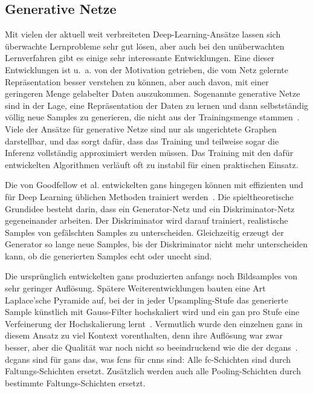\subsection{Generative Netze}

Mit vielen der aktuell weit verbreiteten Deep-Learning-Ansätze lassen sich überwachte Lernprobleme sehr gut lösen, aber auch bei den unüberwachten Lernverfahren gibt es einige sehr interessante Entwicklungen.
Eine dieser Entwicklungen ist u.~a. von der Motivation getrieben, die vom Netz gelernte Repräsentation besser verstehen zu können, aber auch davon, mit einer geringeren Menge gelabelter Daten auszukommen.
Sogenannte generative Netze sind in der Lage, eine Repräsentation der Daten zu lernen und dann selbstständig völlig neue Samples zu generieren, die nicht aus der Trainingsmenge stammen~\cite{Goodfellow.2016}.
Viele der Ansätze für generative Netze sind nur als ungerichtete Graphen darstellbar, und das sorgt dafür, dass das Training und teilweise sogar die Inferenz vollständig approximiert werden müssen.
Das Training mit den dafür entwickelten Algorithmen verläuft oft zu instabil für einen praktischen Einsatz.

Die von Goodfellow et al. entwickelten \glspl{gan} hingegen können mit effizienten und für Deep Learning üblichen Methoden trainiert werden~\cite{Goodfellow.2014}.
Die spieltheoretische Grundidee besteht darin, dass ein Generator-Netz und ein Diskriminator-Netz gegeneinander arbeiten.
Der Diskriminator wird darauf trainiert, realistische Samples von gefälschten Samples zu unterscheiden.
Gleichzeitig erzeugt der Generator so lange neue Samples, bis der Diskriminator nicht mehr unterscheiden kann, ob die generierten Samples echt oder unecht sind.

Die ursprünglich entwickelten \glspl{gan} produzierten anfangs noch Bildsamples von sehr geringer Auflösung.
Spätere Weiterentwicklungen bauten eine Art Laplace'sche Pyramide auf, bei der in jeder Upsampling-Stufe das generierte Sample künstlich mit Gauss-Filter hochskaliert wird und ein \gls{gan} pro Stufe eine Verfeinerung der Hochskalierung lernt~\cite{Denton.2015}.
Vermutlich wurde den einzelnen \glspl{gan} in diesem Ansatz zu viel Kontext vorenthalten, denn ihre Auflösung war zwar besser, aber die Qualität war noch nicht so beeindruckend wie die der \glspl{dcgan}~\cite{Radford.2016}.
\glspl{dcgan} sind für \glspl{gan} das, was \glspl{fcn} für \glspl{cnn} sind:
Alle \gls{fc}-Schichten sind durch Faltungs-Schichten ersetzt.
Zusätzlich werden auch alle Pooling-Schichten durch bestimmte Faltungs-Schichten ersetzt.


